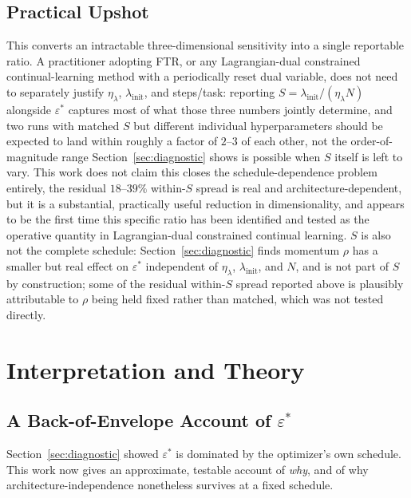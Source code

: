 \documentclass[11pt]{article}
\newcommand{\eps}{\varepsilon}
\newcommand{\epsstar}{\eps^{*}}
\begin{document}
\subsection{Practical Upshot}
This converts an intractable three-dimensional sensitivity into a single
reportable ratio. A practitioner adopting FTR, or any Lagrangian-dual
constrained continual-learning method with a periodically reset dual
variable, does not need to separately justify $\eta_\lambda$,
$\lambda_{\mathrm{init}}$, and steps/task: reporting $S=\lambda_{\mathrm{init}}/(\eta_\lambda N)$
alongside $\epsstar$ captures most of what those three numbers jointly
determine, and two runs with matched $S$ but different individual
hyperparameters should be expected to land within roughly a factor of $2$--$3$
of each other, not the order-of-magnitude range Section~\ref{sec:diagnostic}
shows is possible when $S$ itself is left to vary. This work does not claim this
closes the schedule-dependence problem entirely, the residual $18$--$39\%$
within-$S$ spread is real and architecture-dependent, but it is a
substantial, practically useful reduction in dimensionality, and appears
to be the first time this specific ratio has been identified and
tested as the operative quantity in Lagrangian-dual constrained continual
learning. $S$ is also not the complete schedule: Section~\ref{sec:diagnostic}
finds momentum $\rho$ has a smaller but real effect on $\epsstar$
independent of $\eta_\lambda$, $\lambda_{\mathrm{init}}$, and $N$, and is
not part of $S$ by construction; some of the residual within-$S$ spread
reported above is plausibly attributable to $\rho$ being held fixed rather
than matched, which was not tested directly.

\section{Interpretation and Theory}
\label{sec:theory}

\subsection{A Back-of-Envelope Account of $\epsstar$}
\label{sec:theory-derivation}
Section~\ref{sec:diagnostic} showed $\epsstar$ is dominated by the
optimizer's own schedule. This work now gives an approximate, testable account of
\emph{why}, and of why architecture-independence nonetheless survives at a
fixed schedule.
\end{document}
